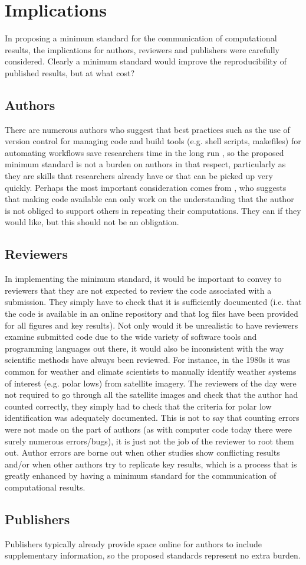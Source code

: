 \section{Implications}

In proposing a minimum standard for the communication of computational results, the implications for authors, reviewers and publishers were carefully considered. Clearly a minimum standard would improve the reproducibility of published results, but at what cost?

\subsection{Authors}

There are numerous authors who suggest that best practices such as the use of version control for managing code and build tools (e.g. shell scripts, makefiles) for automating workflows save researchers time in the long run \citep[e.g.][]{Sandve2013,Wilson2014a}, so the proposed minimum standard is not a burden on authors in that respect, particularly as they are skills that researchers already have or that can be picked up very quickly. Perhaps the most important consideration comes from \citet{Easterbrook2014}, who suggests that making code available can only work on the understanding that the author is not obliged to support others in repeating their computations. They can if they would like, but this should not be an obligation.

\subsection{Reviewers}

In implementing the minimum standard, it would be important to convey to reviewers that they are not expected to review the code associated with a submission. They simply have to check that it is sufficiently documented (i.e. that the code is available in an online repository and that log files have been provided for all figures and key results). Not only would it be unrealistic to have reviewers examine submitted code due to the wide variety of software tools and programming languages out there, it would also be inconsistent with the way scientific methods have always been reviewed. For instance, in the 1980s it was common for weather and climate scientists to manually identify weather systems of interest (e.g. polar lows) from satellite imagery. The reviewers of the day were not required to go through all the satellite images and check that the author had counted correctly, they simply had to check that the criteria for polar low identification was adequately documented. This is not to say that counting errors were not made on the part of authors (as with computer code today there were surely numerous errors/bugs), it is just not the job of the reviewer to root them out. Author errors are borne out when other studies show conflicting results and/or when other authors try to replicate key results, which is a process that is greatly enhanced by having a minimum standard for the communication of computational results.

\subsection{Publishers}

Publishers typically already provide space online for authors to include supplementary information, so the proposed standards represent no extra burden. 